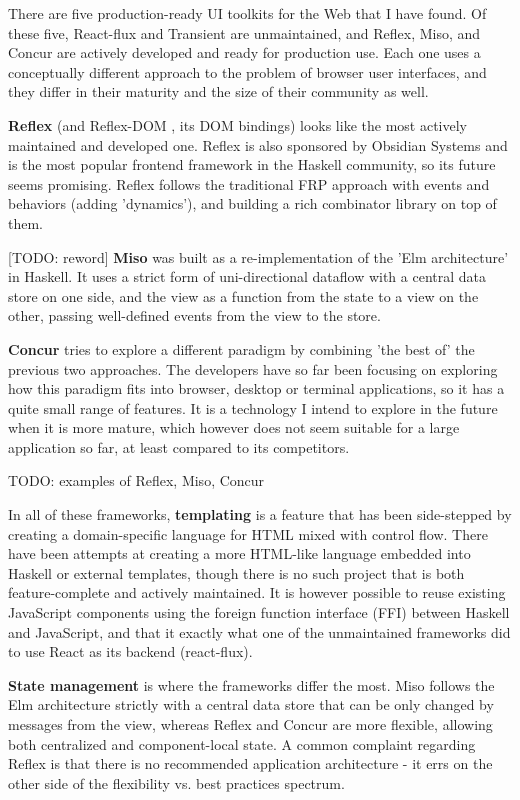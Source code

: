 \documentclass[english,odsaz]{fitthesis}
\begin{document}
There are five production-ready UI toolkits for the Web that I have found. Of
these five, React-flux and Transient are unmaintained, and Reflex, Miso, and
Concur are actively developed and ready for production use. Each one uses a
conceptually different approach to the problem of browser user interfaces, and
they differ in their maturity and the size of their community as well.

\textbf{Reflex} \cite{reflex} (and Reflex-DOM \cite{reflex-dom}, its DOM bindings) looks like
the most actively maintained and developed one. Reflex is also sponsored by
Obsidian Systems \cite{obsidian} and is the most popular frontend framework in the
Haskell community, so its future seems promising. Reflex follows the traditional
FRP approach with events and behaviors (adding 'dynamics'), and
building a rich combinator library on top of them.

[TODO: reword] \textbf{Miso} \cite{miso} was built as a re-implementation of the 'Elm
architecture' in Haskell. It uses a strict form of uni-directional dataflow with
a central data store on one side, and the view as a function from the state to a
view on the other, passing well-defined events from the view to the store.

\textbf{Concur} \cite{concur} tries to explore a different paradigm by combining 'the best
of' the previous two approaches. The developers have so far been focusing on
exploring how this paradigm fits into browser, desktop or terminal applications,
so it has a quite small range of features. It is a technology I intend to explore
in the future when it is more mature, which however does not seem suitable for a
large application so far, at least compared to its competitors.

TODO: examples of Reflex, Miso, Concur

In all of these frameworks, \textbf{templating} is a feature that has been side-stepped
by creating a domain-specific language for HTML mixed with control flow. There
have been attempts at creating a more HTML-like language embedded into Haskell
or external templates, though there is no such project that is both
feature-complete and actively maintained. It is however possible to reuse
existing JavaScript components using the foreign function interface (FFI)
between Haskell and JavaScript, and that it exactly what one of the unmaintained
frameworks did to use React as its backend (react-flux).

\textbf{State management} is where the frameworks differ the most. Miso follows the Elm
architecture strictly with a central data store that can be only changed by
messages from the view, whereas Reflex and Concur are more flexible, allowing
both centralized and component-local state. A common complaint regarding Reflex
is that there is no recommended application architecture - it errs on the
other side of the flexibility vs. best practices spectrum.
\end{document}
